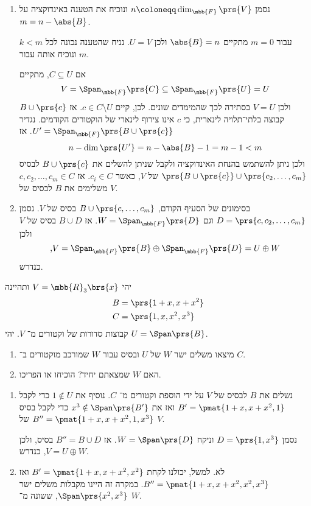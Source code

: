 \documentclass[a4paper,10pt,twoside,openany]{book}
\begin{document}
\begin{solution}
\begin{enumerate}
\item נסמן
$n \coloneqq \dim_{\mbb{F}}\prs{V}$
ונוכיח את הטענה באינדוקציה על
$m = n - \abs{B}$.

עבור
$m = 0$
מתקיים
$\abs{B} = n$
ולכן
$U = V$.
נניח שהטענה נכונה לכל
$k < m$
ונוכיח אותה עבור
$m$.

אם
$C \subseteq U$,
מתקיים
\[V = \Span_{\mbb{F}}\prs{C} \subseteq \Span_{\mbb{F}}\prs{U} = U\]
ולכן
$V = U$
בסתירה לכך שהמימדים שונים.
לכן, קיים
$c \in C \setminus U$.
אז
$B \cup \prs{c}$
קבוצה בלתי־תלויה לינארית, כי
$c$
אינו צירוף לינארי של הוקטורים הקודמים. נגדיר
$U' = \Span_{\mbb{F}}\prs{B \cup \prs{c}}$.
אז
\[n - \dim\prs{U'} = n - \abs{B} - 1 = m-1 < m\]
ולכן ניתן להשתמש בהנחת האינדוקציה ולקבל שניתן להשלים את
$B \cup \prs{c}$
לבסיס
$\prs{B \cup \prs{c}} \cup \prs{c_2, \ldots, c_m}$
של
$V$,
כאשר
$c_i \in C$.
אז
$c, c_2, \ldots, c_m \in C$
משלימים את
$B$
לבסיס של
$V$.

\item בסימונים של הסעיף הקודם,
$B \cup \prs{c, \ldots, c_m}$
בסיס של
$V$.
נסמן
$D = \prs{c, c_2, \ldots, c_m}$
וגם
$W = \Span_{\mbb{F}}\prs{D}$.
אז
$B \cup D$
בסיס של
$V$
ולכן
\[\text{,} V = \Span_{\mbb{F}}\prs{B} \oplus \Span_{\mbb{F}}\prs{D} = U \oplus W\]
כנדרש.
\end{enumerate}
\end{solution}

\begin{exercisechap}
יהי
$V = \mbb{R}_3\brs{x}$
ותהיינה
\begin{align*}
B &= \prs{1+x, x+x^2} \\
C &= \prs{1, x, x^2, x^3}
\end{align*}
קבוצות סדורות של וקטורים מ־%
$V$.
יהי
$U = \Span\prs{B}$.

\begin{enumerate}
\item מיצאו משלים ישר
$W$
של
$U$
ובסיס עבור
$W$
שמורכב מוקטורים ב־%
$C$.
\item
האם
$W$
שמצאתם יחיד? הוכיחו או הפריכו.
\end{enumerate}
\end{exercisechap}

\begin{solution}
\begin{enumerate}
\item נשלים את
$B$
לבסיס של
$V$
על ידי הוספת וקטורים מ־%
$C$.
נוסיף את
$1 \notin U$
כדי לקבל
$B' = \pmat{1 + x, x + x^2, 1}$
ואז את
$x^3 \notin \Span\prs{B'}$
כדי לקבל בסיס
$B'' = \pmat{1 + x, x + x^2, 1, x^3}$
של
$V$.

נסמן
$D = \prs{1, x^3}$
וניקח
$W = \Span\prs{D}$.
אז
$B'' = B \cup D$
בסיס,
ולכן
$V = U \oplus W$,
כנדרש.

\item לא.
למשל, יכולנו לקחת
$B' = \pmat{1 + x, x + x^2, x^2}$
ואז
$B'' = \pmat{1 + x, x + x^2, x^2, x^3}$.
במקרה זה היינו מקבלות משלים ישר
$\Span\prs{x^2, x^3}$,
ששונה מ־%
$W$.
\end{enumerate}
\end{solution}
\end{document}
